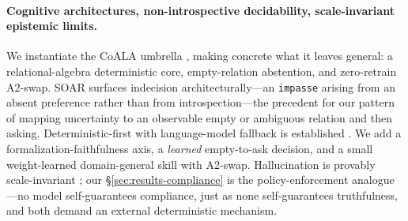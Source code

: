 \paragraph{Cognitive architectures, non-introspective decidability, scale-invariant epistemic limits.} We instantiate the CoALA umbrella \citep{ax2309_02427}, making concrete what it leaves general: a relational-algebra deterministic core, empty-relation abstention, and zero-retrain A2-swap. SOAR \citep{ax2505_07087} surfaces indecision architecturally---an \texttt{impasse} arising from an absent preference rather than from introspection---the precedent for our pattern of mapping uncertainty to an observable empty or ambiguous relation and then asking. Deterministic-first with language-model fallback is established \citep{ax2403_00810,ax2510_09355}. We add a formalization-faithfulness axis, a \emph{learned} empty-to-ask decision, and a small weight-learned domain-general skill with A2-swap. Hallucination is provably scale-invariant \citep{ax2401_11817,ax2509_04664}; our \S\ref{sec:results-compliance} is the policy-enforcement analogue---no model self-guarantees compliance, just as none self-guarantees truthfulness, and both demand an external deterministic mechanism.

